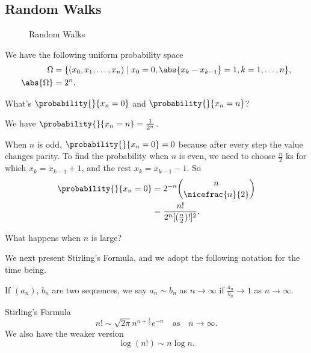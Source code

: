 \subsection{Random Walks}
\begin{figure}[htpb]
    \begin{subfigure}{0.48\textwidth}
    \centering
    \end{subfigure}
    \begin{subfigure}{0.48\textwidth}
    \centering
    \end{subfigure}
    \caption{Random Walks}
    \label{fig:}
\end{figure}
We have the following uniform probability space
\begin{align*}
    \Omega &= \{(x_0, x_1, \ldots ,x_n) \mid x_0 = 0, \abs{x_k - x_{k-1}} = 1, k = 1, \ldots, n\},\\
    \abs{\Omega} &= 2^n.
\end{align*}
\begin{problem}
    What's \(\probability{}{x_n = 0}\) and \(\probability{}{x_n = n} \)?
\end{problem}
We have \(\probability{}{x_n = n} = \frac{1}{2^n}\).

When \(n\) is odd, \(\probability{}{x_n = 0} = 0\) because after every step the value changes parity. To find the probability when \(n\) is even, we need to choose \(\frac{n}{2}\) ks for which \(x_k = x_{k-1} + 1\), and the rest \(x_k = x_{k-1}-1\). So
\begin{align*}
    \probability{}{x_n=0} &= 2^{-n}\binom{n}{\nicefrac{n}{2}}\\
    &= \frac{n!}{2^n[(\frac{n}{2})!]^2}.
\end{align*}
\begin{problem}
    What happens when \(n\) is large?
\end{problem}
We next present Stirling's Formula, and we adopt the following notation for the time being.
\begin{notation}
    If \((a_n)\), \(b_n\) are two sequences, we say \(a_{n} \sim b_n \) as \(n \to \infty\) if \(\frac{a_n}{b_n}\to 1\) as \(n \to \infty\).
\end{notation}
\begin{theorem}{Stirling's Formula}{}
    \leavevmode
    \[
        n! \sim \sqrt{2\pi} n^{n+\frac{1}{2}}e^{-n} \quad \text{as}\quad n \to \infty.
    \]
    We also have the weaker version
    \[
        \log(n!)\sim n\log n.
    \]
\end{theorem}